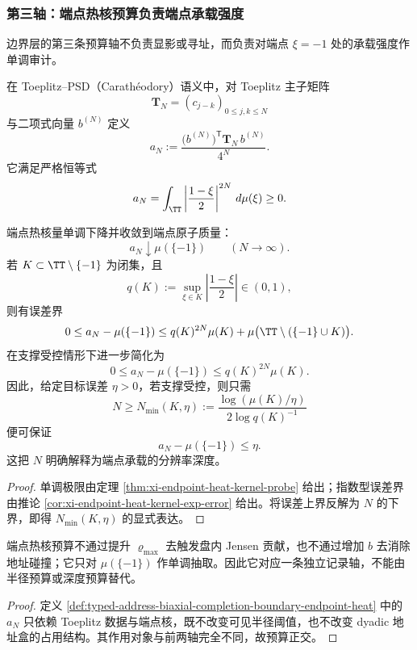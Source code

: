 \subsubsection{第三轴：端点热核预算负责端点承载强度}\label{subsubsec:typed-address-biaxial-completion-boundary-endpoint}
边界层的第三条预算轴不负责显影或寻址，而负责对端点 \(\xi=-1\) 处的承载强度作单调审计。

\begin{definition}[端点热核量]\label{def:typed-address-biaxial-completion-boundary-endpoint-heat}
在 Toeplitz--PSD（Carath\'eodory）语义中，对 Toeplitz 主子矩阵
\[
\mathbf{T}_N=(c_{j-k})_{0\le j,k\le N}
\]
与二项式向量 \(b^{(N)}\) 定义
\[
a_N:=\frac{\bigl(b^{(N)}\bigr)^{\mathsf T}\mathbf{T}_N\,b^{(N)}}{4^N}.
\]
它满足严格恒等式
\[
a_N=\int_{\TT}\left|\frac{1-\xi}{2}\right|^{2N}\,d\mu(\xi)\ge 0.
\]
\end{definition}

\begin{proposition}[单调极限与指数误差]\label{prop:typed-address-biaxial-completion-boundary-endpoint-heat}
端点热核量单调下降并收敛到端点原子质量：
\[
a_N\downarrow \mu(\{-1\})\qquad(N\to\infty).
\]
若 \(K\subset \TT\setminus\{-1\}\) 为闭集，且
\[
q(K):=\sup_{\xi\in K}\left|\frac{1-\xi}{2}\right|\in(0,1),
\]
则有误差界
\[
0\le a_N-\mu(\{-1\})\le q(K)^{2N}\mu(K)+\mu\bigl(\TT\setminus(\{-1\}\cup K)\bigr).
\]
在支撑受控情形下进一步简化为
\[
0\le a_N-\mu(\{-1\})\le q(K)^{2N}\mu(K).
\]
因此，给定目标误差 \(\eta>0\)，若支撑受控，则只需
\[
N\ge N_{\min}(K,\eta):=
\frac{\log(\mu(K)/\eta)}{2\log q(K)^{-1}}
\]
便可保证
\[
a_N-\mu(\{-1\})\le \eta.
\]
这把 \(N\) 明确解释为端点承载的分辨率深度。
\end{proposition}
\begin{proof}
单调极限由定理 \ref{thm:xi-endpoint-heat-kernel-probe} 给出；指数型误差界由推论 \ref{cor:xi-endpoint-heat-kernel-exp-error} 给出。将误差上界反解为 \(N\) 的下界，即得 \(N_{\min}(K,\eta)\) 的显式表达。
\end{proof}

\begin{corollary}[端点预算与前两轴正交]\label{cor:typed-address-biaxial-completion-boundary-endpoint-orthogonal}
端点热核预算不通过提升 \(\varrho_{\max}\) 去触发盘内 Jensen 贡献，也不通过增加 \(b\) 去消除地址碰撞；它只对 \(\mu(\{-1\})\) 作单调抽取。因此它对应一条独立记录轴，不能由半径预算或深度预算替代。
\end{corollary}
\begin{proof}
定义 \ref{def:typed-address-biaxial-completion-boundary-endpoint-heat} 中的 \(a_N\) 只依赖 Toeplitz 数据与端点核，既不改变可见半径阈值，也不改变 dyadic 地址盒的占用结构。其作用对象与前两轴完全不同，故预算正交。
\end{proof}

